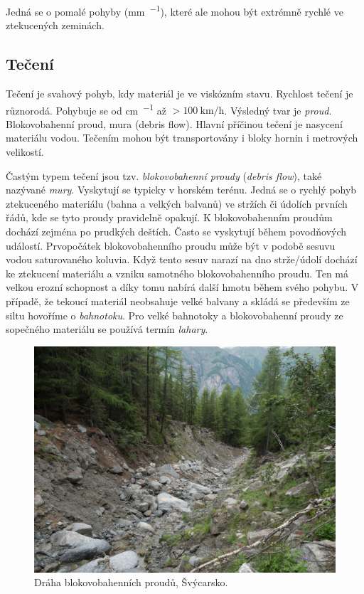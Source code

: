 Jedná se o pomalé pohyby (\si{\milli\metre\per\rok}), které ale mohou být extrémně rychlé ve ztekucených zeminách.

\subsection{Tečení}
Tečení je svahový pohyb, kdy materiál je ve viskózním stavu. Rychlost tečení je různorodá. Pohybuje se od \si{\centi\metre\per\den} až $>\SI{100}{\kilo\metre\per\hour}$. Výsledný tvar je \emph{proud}. Blokovobahenní proud, mura (debris flow). Hlavní příčinou tečení je nasycení materiálu vodou. Tečením mohou být transportovány i bloky hornin i metrových velikostí. 

\label{blokovo}
Častým typem tečení jsou tzv. \emph{blokovobahenní proudy} (\textit{debris flow}), také nazývané \emph{mury}. Vyskytují se typicky v horském terénu. Jedná se o rychlý pohyb ztekuceného materiálu (bahna a velkých balvanů) ve stržích či údolích prvních řádů, kde se tyto proudy pravidelně opakují. K blokovobahenním proudům dochází zejména po prudkých deštích. Často se vyskytují během povodňových událostí. Prvopočátek blokovobahenního proudu může být v podobě sesuvu vodou saturovaného koluvia. Když tento sesuv narazí na dno strže/údolí dochází ke ztekucení materiálu a vzniku samotného blokovobahenního proudu. Ten má velkou erozní schopnost a díky tomu nabírá další hmotu během svého pohybu.  V případě, že tekoucí materiál neobsahuje velké balvany a skládá se především ze siltu hovoříme o \emph{bahnotoku}. Pro velké bahnotoky a blokovobahenní proudy ze sopečného materiálu se používá termín \emph{lahary}.

\begin{figure}
	\centering
	\includegraphics[width=1\linewidth]{obrazky/slope/debris_flow}
	\caption{Dráha blokovobahenních proudů, Švýcarsko.}
	\label{fig:debrisflow}
\end{figure}


